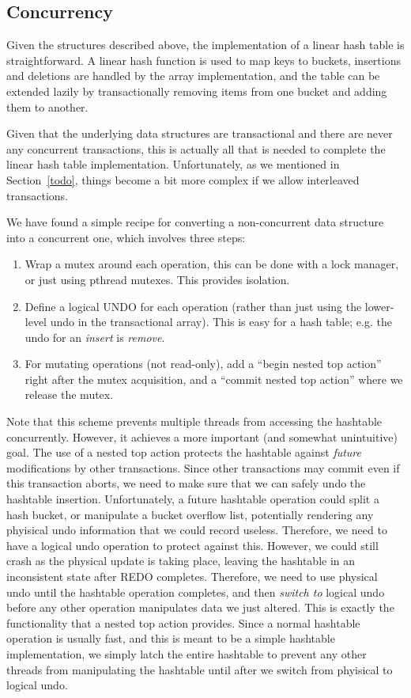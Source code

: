 \documentclass[letterpaper,twocolumn,english]{article}
\begin{document}
\subsection{Concurrency}

Given the structures described above, the implementation of a linear hash
table is straightforward.  A linear hash function is used to map keys
to buckets, insertions and deletions are handled by the array implementation,
and the table can be extended lazily by transactionally removing items
from one bucket and adding them to another.

Given that the underlying data structures are transactional and there
are never any concurrent transactions, this is actually all that is
needed to complete the linear hash table implementation.
Unfortunately, as we mentioned in Section~\ref{todo}, things become a
bit more complex if we allow interleaved transactions. 

We have found a simple recipe for converting a non-concurrent data structure into a concurrent one, which involves three steps:
\begin{enumerate}
\item Wrap a mutex around each operation, this can be done with a lock
  manager, or just using pthread mutexes.  This provides isolation.
\item Define a logical UNDO for each operation (rather than just using
  the lower-level undo in the transactional array).  This is easy for a
  hash table; e.g. the undo for an {\em insert} is {\em remove}.
\item For mutating operations (not read-only), add a ``begin nested
  top action'' right after the mutex acquisition, and a ``commit
  nested top action'' where we release the mutex.
\end{enumerate}

Note that this scheme prevents multiple threads from accessing the
hashtable concurrently.  However, it achieves a more important (and
somewhat unintuitive) goal.  The use of a nested top action protects
the hashtable against {\em future} modifications by other
transactions.  Since other transactions may commit even if this
transaction aborts, we need to make sure that we can safely undo the
hashtable insertion.  Unfortunately, a future hashtable operation
could split a hash bucket, or manipulate a bucket overflow list,
potentially rendering any phyisical undo information that we could
record useless.  Therefore, we need to have a logical undo operation
to protect against this.  However, we could still crash as the
physical update is taking place, leaving the hashtable in an
inconsistent state after REDO completes.  Therefore, we need to use
physical undo until the hashtable operation completes, and then {\em
switch to} logical undo before any other operation manipulates data we
just altered.  This is exactly the functionality that a nested top
action provides.  Since a normal hashtable operation is usually fast,
and this is meant to be a simple hashtable implementation, we simply
latch the entire hashtable to prevent any other threads from
manipulating the hashtable until after we switch from phyisical to
logical undo.
\end{document}
